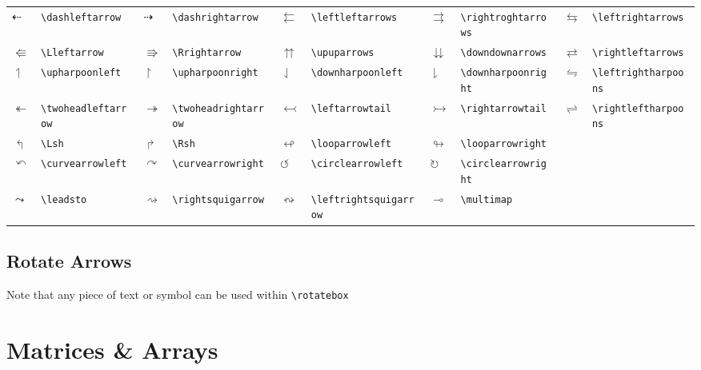 \documentclass[10pt, english]{article}
\begin{document}
	\begin{center}
		\scriptsize
	\begin{tabular}{ll|ll|ll|ll|ll}
		$\dashleftarrow$ & \verb|\dashleftarrow| & $\dashrightarrow$ & \verb|\dashrightarrow| & $\leftleftarrows$ & \verb|\leftleftarrows| & $\rightrightarrows$ & \verb|\rightroghtarrows| & $\leftrightarrows$ & \verb|\leftrightarrows| \\ 
		$\Lleftarrow$ & \verb|\Lleftarrow| & $\Rrightarrow$ & \verb|\Rrightarrow| & $\upuparrows$ & \verb|\upuparrows| & $\downdownarrows$ & \verb|\downdownarrows| & $\rightleftarrows$ & \verb|\rightleftarrows| \\
		$\upharpoonleft$ & \verb|\upharpoonleft| & $\upharpoonright$ & \verb|\upharpoonright| & $\downharpoonleft$ & \verb|\downharpoonleft| & $\downharpoonright$ & \verb|\downharpoonright| & $\leftrightharpoons$ & \verb|\leftrightharpoons|\\
		$\twoheadleftarrow$ & \verb|\twoheadleftarrow| & $\twoheadrightarrow$ & \verb|\twoheadrightarrow| & $\leftarrowtail$ & \verb|\leftarrowtail| & $\rightarrowtail$ & \verb|\rightarrowtail| & $\rightleftharpoons$ & \verb|\rightleftharpoons| \\
		$\Lsh$ & \verb|\Lsh| & $\Rsh$ & \verb|\Rsh| & $\looparrowleft$ & \verb|\looparrowleft| & $\looparrowright$ & \verb|\looparrowright| \\
		$\curvearrowleft$ & \verb|\curvearrowleft| & $\curvearrowright$ & \verb|\curvearrowright| & $\circlearrowleft$ & \verb|\circlearrowleft| & $\circlearrowright$ & \verb|\circlearrowright| \\
		$\leadsto$ & \verb|\leadsto| & $\rightsquigarrow$ & \verb|\rightsquigarrow| & $\leftrightsquigarrow$ & \verb|\leftrightsquigarrow| & $\multimap$ & \verb|\multimap| \\
	\end{tabular}
	\end{center}

	\subsection{Rotate Arrows}

Note that any piece of text or symbol can be used within \verb|\rotatebox|

\newpage

\section{Matrices \& Arrays}
\end{document}
